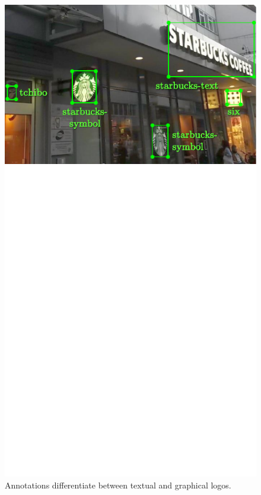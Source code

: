 \documentclass[a4paper,twoside]{article}
\begin{document}
\begin{figure}%
\centering%
\includegraphics[width=\linewidth, trim=0cm 9.9cm 0cm 0cm, clip]{img/annotatedSample.pdf}%
\caption{Annotations differentiate between textual and graphical logos.}%
\label{fig:annotatedSample}
\end{figure}%
%
\end{document}
